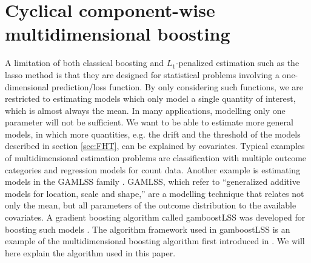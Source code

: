 \section{Cyclical component-wise multidimensional boosting}
A limitation of both classical boosting \citep{friedman2001} and $L_1$-penalized estimation such as the lasso method \citep{lasso} is that they are designed for statistical problems involving a one-dimensional prediction/loss function. By only considering such functions, we are restricted to estimating models which only model a single quantity of interest, which is almost always the mean.
In many applications, modelling only one parameter will not be sufficient. We want to be able to estimate more general models, in which more quantities, e.g. the drift and the threshold of the models described in section \ref{sec:FHT}, can be explained by covariates. Typical examples of multidimensional estimation problems are classification with multiple outcome categories and regression models for count data. Another example is estimating models in the GAMLSS family \citep{gamlss}. GAMLSS, which refer to ``generalized additive models for location, scale and shape,'' are a modelling technique that relates not only the mean, but all parameters of the outcome distribution to the available covariates. A gradient boosting algorithm called gamboostLSS was developed for boosting such models \citep{gamboostlss-paper}. The algorithm framework used in gamboostLSS is an example of the multidimensional boosting algorithm first introduced in \citet{schmid}. We will here explain the algorithm used in this paper.

